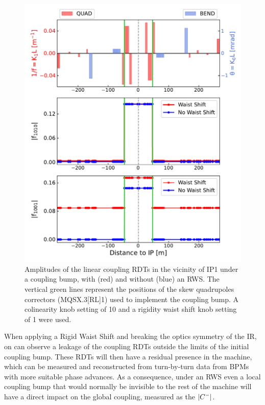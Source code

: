 \begin{figure}[!htb]
    \centering
    \includegraphics*[width=\textwidth]{Figures/IR_Coupling_Correction/waist_shift_leaks_rdts.pdf}
    \caption{Amplitudes of the linear coupling RDTs in the vicinity of IP\num{1} under a coupling bump, with (\textcolor{mplr}{red}) and without (\textcolor{mplb}{blue}) an RWS. The vertical \textcolor{mqsx_green}{green} lines represent the positions of the skew quadrupoles correctors (MQSX.\num{3}[RL]\num{1}) used to implement the coupling bump. A colinearity knob setting of \num{10} and a rigidity waist shift knob setting of \num{1} were used.}
    \label{figure:rdt_leak}
\end{figure}

When applying a Rigid Waist Shift and breaking the optics symmetry of the IR, on can observe a leakage of the coupling RDTs outside the limits of the initial coupling bump.
These RDTs will then have a residual presence in the machine, which can be measured and reconstructed from turn-by-turn data from BPMs with more suitable phase advances.
As a consequence, under an RWS even a local coupling bump that would normally be invisible to the rest of the machine will have a direct impact on the global coupling, measured as the \(\left\lvert C^{-} \right\rvert\).

